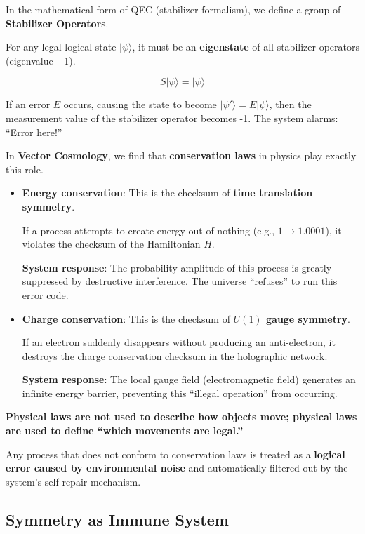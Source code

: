 In the mathematical form of QEC (stabilizer formalism), we define a group of \textbf{Stabilizer Operators}.

For any legal logical state $|\psi\rangle$, it must be an \textbf{eigenstate} of all stabilizer operators (eigenvalue +1).

\[S |\psi\rangle = |\psi\rangle\]

If an error $E$ occurs, causing the state to become $|\psi'\rangle = E|\psi\rangle$, then the measurement value of the stabilizer operator becomes -1. The system alarms: ``Error here!''

In \textbf{Vector Cosmology}, we find that \textbf{conservation laws} in physics play exactly this role.

\begin{itemize}
\item \textbf{Energy conservation}: This is the checksum of \textbf{time translation symmetry}.

    If a process attempts to create energy out of nothing (e.g., $1 \to 1.0001$), it violates the checksum of the Hamiltonian $H$.

    \textbf{System response}: The probability amplitude of this process is greatly suppressed by destructive interference. The universe ``refuses'' to run this error code.

\item \textbf{Charge conservation}: This is the checksum of \textbf{$U(1)$ gauge symmetry}.

    If an electron suddenly disappears without producing an anti-electron, it destroys the charge conservation checksum in the holographic network.

    \textbf{System response}: The local gauge field (electromagnetic field) generates an infinite energy barrier, preventing this ``illegal operation'' from occurring.
\end{itemize}

\textbf{Physical laws are not used to describe how objects move; physical laws are used to define ``which movements are legal.''}

Any process that does not conform to conservation laws is treated as a \textbf{logical error caused by environmental noise} and automatically filtered out by the system's self-repair mechanism.

\subsection{Symmetry as Immune System}

